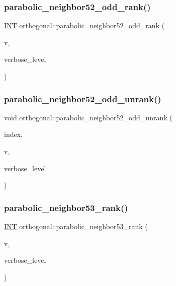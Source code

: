 \subsubsection{\texorpdfstring{parabolic\+\_\+neighbor52\+\_\+odd\+\_\+rank()}{parabolic\_neighbor52\_odd\_rank()}}
{\footnotesize\ttfamily \mbox{\hyperlink{galois_8h_a09fddde158a3a20bd2dcadb609de11dc}{I\+NT}} orthogonal\+::parabolic\+\_\+neighbor52\+\_\+odd\+\_\+rank (\begin{DoxyParamCaption}\item[{\mbox{\hyperlink{galois_8h_a09fddde158a3a20bd2dcadb609de11dc}{I\+NT}} $\ast$}]{v,  }\item[{\mbox{\hyperlink{galois_8h_a09fddde158a3a20bd2dcadb609de11dc}{I\+NT}}}]{verbose\+\_\+level }\end{DoxyParamCaption})}

\mbox{\label{classorthogonal_afc96de048809a0c64c28ecfe16a00221}} 
\subsubsection{\texorpdfstring{parabolic\+\_\+neighbor52\+\_\+odd\+\_\+unrank()}{parabolic\_neighbor52\_odd\_unrank()}}
{\footnotesize\ttfamily void orthogonal\+::parabolic\+\_\+neighbor52\+\_\+odd\+\_\+unrank (\begin{DoxyParamCaption}\item[{\mbox{\hyperlink{galois_8h_a09fddde158a3a20bd2dcadb609de11dc}{I\+NT}}}]{index,  }\item[{\mbox{\hyperlink{galois_8h_a09fddde158a3a20bd2dcadb609de11dc}{I\+NT}} $\ast$}]{v,  }\item[{\mbox{\hyperlink{galois_8h_a09fddde158a3a20bd2dcadb609de11dc}{I\+NT}}}]{verbose\+\_\+level }\end{DoxyParamCaption})}

\mbox{\label{classorthogonal_aeac497724346642dc1e70eed896d4bfc}} 
\subsubsection{\texorpdfstring{parabolic\+\_\+neighbor53\+\_\+rank()}{parabolic\_neighbor53\_rank()}}
{\footnotesize\ttfamily \mbox{\hyperlink{galois_8h_a09fddde158a3a20bd2dcadb609de11dc}{I\+NT}} orthogonal\+::parabolic\+\_\+neighbor53\+\_\+rank (\begin{DoxyParamCaption}\item[{\mbox{\hyperlink{galois_8h_a09fddde158a3a20bd2dcadb609de11dc}{I\+NT}} $\ast$}]{v,  }\item[{\mbox{\hyperlink{galois_8h_a09fddde158a3a20bd2dcadb609de11dc}{I\+NT}}}]{verbose\+\_\+level }\end{DoxyParamCaption})}

